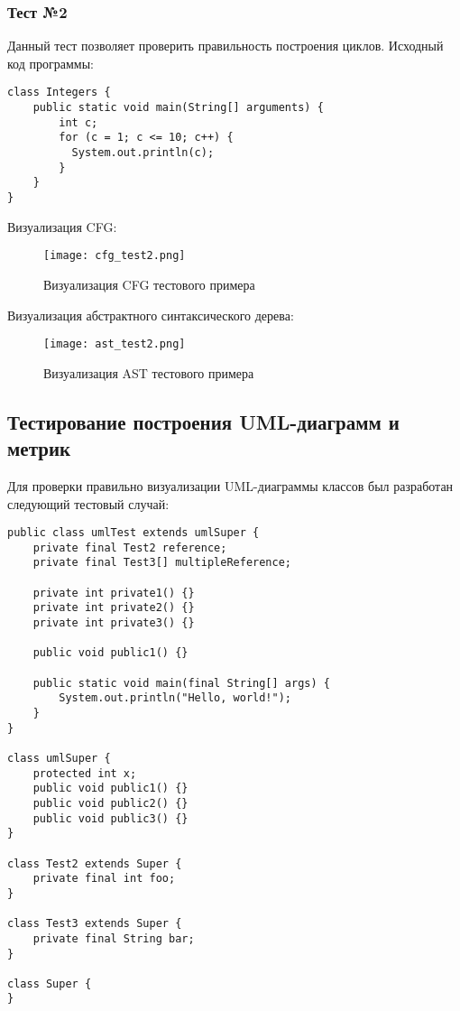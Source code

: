 \subsubsection{Тест №2}

Данный тест позволяет проверить правильность построения циклов. Исходный код
программы:

\begin{lstlisting}[caption={Тестовая программа}]
class Integers {
    public static void main(String[] arguments) {
        int c;
        for (c = 1; c <= 10; c++) {
          System.out.println(c);
        }
    }
}
\end{lstlisting}

Визуализация CFG:

\begin{figure}[h]
    \begin{center}
        \texttt{[image: cfg\_test2.png]}
    \end{center}
    \caption{Визуализация CFG тестового примера}
    \label{fig:cfg_test2}
\end{figure}

Визуализация абстрактного синтаксического дерева:

\newpage
\begin{figure}[h]
    \begin{center}
        \texttt{[image: ast\_test2.png]}
    \end{center}
    \caption{Визуализация AST тестового примера}
    \label{fig:ast_test2}
\end{figure}

\subsection{Тестирование построения UML-диаграмм и метрик}

Для проверки правильно визуализации UML-диаграммы классов был разработан
следующий тестовый случай:

\begin{lstlisting}[caption={Тестовая программа}]
public class umlTest extends umlSuper {
    private final Test2 reference;
    private final Test3[] multipleReference;

    private int private1() {}
    private int private2() {}
    private int private3() {}

    public void public1() {}

    public static void main(final String[] args) {
        System.out.println("Hello, world!");
    }
}

class umlSuper {
    protected int x;
    public void public1() {}
    public void public2() {}
    public void public3() {}
}

class Test2 extends Super {
    private final int foo;
}

class Test3 extends Super {
    private final String bar;
}

class Super {
}
\end{lstlisting}

